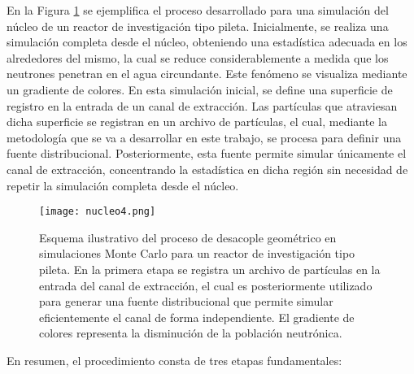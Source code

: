 En la Figura \ref{fig:nucleo4} se ejemplifica el proceso desarrollado para una simulación del núcleo de un reactor de investigación tipo pileta. Inicialmente, se realiza una simulación completa desde el núcleo, obteniendo una estadística adecuada en los alrededores del mismo, la cual se reduce considerablemente a medida que los neutrones penetran en el agua circundante. Este fenómeno se visualiza mediante un gradiente de colores. En esta simulación inicial, se define una superficie de registro en la entrada de un canal de extracción. Las partículas que atraviesan dicha superficie se registran en un archivo de partículas, el cual, mediante la metodología que se va a desarrollar en este trabajo, se procesa para definir una fuente distribucional. Posteriormente, esta fuente permite simular únicamente el canal de extracción, concentrando la estadística en dicha región sin necesidad de repetir la simulación completa desde el núcleo.

\begin{figure}[H]
    \centering
    \texttt{[image: nucleo4.png]}
    \caption{Esquema ilustrativo del proceso de desacople geométrico en simulaciones Monte Carlo para un reactor de investigación tipo pileta. En la primera etapa se registra un archivo de partículas en la entrada del canal de extracción, el cual es posteriormente utilizado para generar una fuente distribucional que permite simular eficientemente el canal de forma independiente. El gradiente de colores representa la disminución de la población neutrónica.}
    \label{fig:nucleo4}
\end{figure}


En resumen, el procedimiento consta de tres etapas fundamentales:

